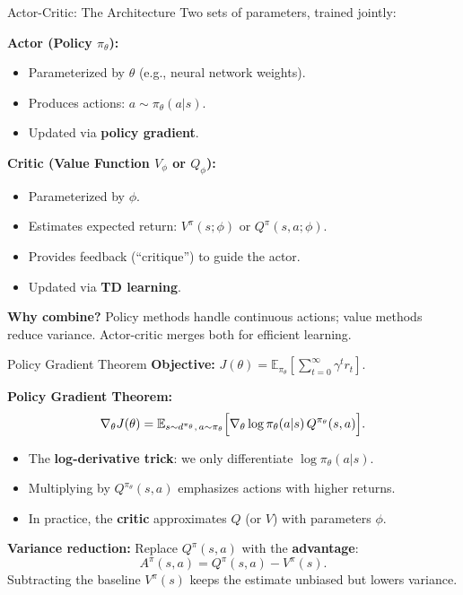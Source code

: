 \documentclass[10pt,english,aspectratio=169]{beamer}
\begin{document}
\begin{frame}{Actor-Critic: The Architecture}
    Two sets of parameters, trained jointly:

    \vspace{0.3cm}
    \textbf{Actor (Policy $\pi_\theta$):}
    \begin{itemize}
        \item Parameterized by $\theta$ (e.g., neural network weights).
        \item Produces actions: $a \sim \pi_\theta(a|s)$.
        \item Updated via \textbf{policy gradient}.
    \end{itemize}

    \vspace{0.3cm}
    \textbf{Critic (Value Function $V_\phi$ or $Q_\phi$):}
    \begin{itemize}
        \item Parameterized by $\phi$.
        \item Estimates expected return: $V^\pi(s;\phi)$ or $Q^\pi(s,a;\phi)$.
        \item Provides feedback (``critique'') to guide the actor.
        \item Updated via \textbf{TD learning}.
    \end{itemize}

    \vspace{0.3cm}
    \textbf{Why combine?} Policy methods handle continuous actions; value methods reduce variance. Actor-critic merges both for efficient learning.
\end{frame}


\begin{frame}{Policy Gradient Theorem}
    \textbf{Objective:}
    $J(\theta) = \mathbb{E}_{\pi_\theta}\!\left[\sum_{t=0}^{\infty} \gamma^t r_t\right]$.

    \vspace{0.3cm}
    \textbf{Policy Gradient Theorem:}
    \[
      \nabla_\theta J(\theta)
      =
      \mathbb{E}_{s \sim d^{\pi_\theta},\, a \sim \pi_\theta}
      \Bigl[
         \nabla_\theta \log\pi_\theta(a | s)\,Q^{\pi_\theta}(s,a)
      \Bigr].
    \]

    \begin{itemize}
        \item The \textbf{log-derivative trick}: we only differentiate $\log \pi_\theta(a|s)$.
        \item Multiplying by $Q^{\pi_\theta}(s,a)$ emphasizes actions with higher returns.
        \item In practice, the \textbf{critic} approximates $Q$ (or $V$) with parameters $\phi$.
    \end{itemize}

    \vspace{0.3cm}
    \textbf{Variance reduction:} Replace $Q^\pi(s,a)$ with the \textbf{advantage}:
    \[
    A^\pi(s,a) = Q^\pi(s,a) - V^\pi(s).
    \]
    Subtracting the baseline $V^\pi(s)$ keeps the estimate unbiased but lowers variance.
\end{frame}
\end{document}
